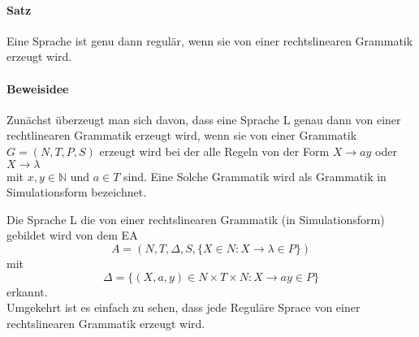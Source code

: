 \paragraph*{Satz}
Eine Sprache ist genu dann regulär, wenn sie von einer rechtslinearen Grammatik erzeugt wird.
\paragraph*{Beweisidee}
Zunächst überzeugt man sich davon, dass eine Sprache L genau dann von einer rechtlinearen Grammatik erzeugt wird, wenn sie von einer Grammatik \(G=(N,T,P,S)\) erzeugt wird bei der alle Regeln von der Form \(X\to ay\) oder \(X\to \lambda\)\\
mit \(x,y\in\mathbb{N}\) und \(a\in T\) sind. Eine Solche Grammatik wird als Grammatik in Simulationsform bezeichnet.\par\bigskip
Die Sprache L die von einer rechtslinearen Grammatik (in Simulationsform) gebildet wird von dem EA 
\[A=(N,T,\Delta,S,\{X\in N: X\to \lambda\in P\})\]
mit 
\[\Delta=\{(X,a,y)\in N\times T\times N:X\to ay\in P\}\]
erkannt.\\
Umgekehrt ist es einfach zu sehen, dass jede Reguläre Sprace von einer rechtslinearen Grammatik erzeugt wird.